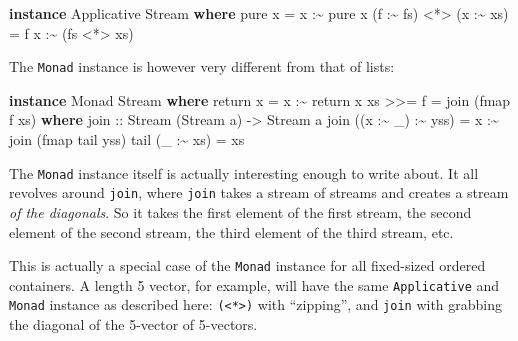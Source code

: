 \documentclass[]{article}
\newenvironment{Shaded}{}{}
\newcommand{\DataTypeTok}[1]{\textcolor[rgb]{0.56,0.13,0.00}{#1}}
\newcommand{\FunctionTok}[1]{\textcolor[rgb]{0.02,0.16,0.49}{#1}}
\newcommand{\KeywordTok}[1]{\textcolor[rgb]{0.00,0.44,0.13}{\textbf{#1}}}
\newcommand{\NormalTok}[1]{#1}
\newcommand{\OperatorTok}[1]{\textcolor[rgb]{0.40,0.40,0.40}{#1}}
\newcommand{\OtherTok}[1]{\textcolor[rgb]{0.00,0.44,0.13}{#1}}
\begin{document}
\begin{Shaded}
\begin{Highlighting}[]
\KeywordTok{instance} \DataTypeTok{Applicative} \DataTypeTok{Stream} \KeywordTok{where}
    \FunctionTok{pure}\NormalTok{ x }\OtherTok{=}\NormalTok{ x }\OperatorTok{:\textasciitilde{}} \FunctionTok{pure}\NormalTok{ x}
\NormalTok{    (f }\OperatorTok{:\textasciitilde{}}\NormalTok{ fs) }\OperatorTok{\textless{}*\textgreater{}}\NormalTok{ (x }\OperatorTok{:\textasciitilde{}}\NormalTok{ xs) }\OtherTok{=}\NormalTok{ f x }\OperatorTok{:\textasciitilde{}}\NormalTok{ (fs }\OperatorTok{\textless{}*\textgreater{}}\NormalTok{ xs)}
\end{Highlighting}
\end{Shaded}

The \texttt{Monad} instance is however very different from that of lists:

\begin{Shaded}
\begin{Highlighting}[]
\KeywordTok{instance} \DataTypeTok{Monad} \DataTypeTok{Stream} \KeywordTok{where}
    \FunctionTok{return}\NormalTok{ x }\OtherTok{=}\NormalTok{ x }\OperatorTok{:\textasciitilde{}} \FunctionTok{return}\NormalTok{ x}
\NormalTok{    xs }\OperatorTok{\textgreater{}\textgreater{}=}\NormalTok{ f }\OtherTok{=}\NormalTok{ join\textquotesingle{} (}\FunctionTok{fmap}\NormalTok{ f xs)}
      \KeywordTok{where}
\OtherTok{        join\textquotesingle{} ::} \DataTypeTok{Stream}\NormalTok{ (}\DataTypeTok{Stream}\NormalTok{ a) }\OtherTok{{-}\textgreater{}} \DataTypeTok{Stream}\NormalTok{ a}
\NormalTok{        join\textquotesingle{} ((x }\OperatorTok{:\textasciitilde{}}\NormalTok{ \_) }\OperatorTok{:\textasciitilde{}}\NormalTok{ yss) }\OtherTok{=}\NormalTok{ x }\OperatorTok{:\textasciitilde{}}\NormalTok{ join\textquotesingle{} (}\FunctionTok{fmap}\NormalTok{ tail\textquotesingle{} yss)}
\NormalTok{        tail\textquotesingle{} (\_ }\OperatorTok{:\textasciitilde{}}\NormalTok{ xs) }\OtherTok{=}\NormalTok{ xs}
\end{Highlighting}
\end{Shaded}

The \texttt{Monad} instance itself is actually interesting enough to write
about. It all revolves around \texttt{join}, where \texttt{join} takes a stream
of streams and creates a stream \emph{of the diagonals}. So it takes the first
element of the first stream, the second element of the second stream, the third
element of the third stream, etc.

This is actually a special case of the \texttt{Monad} instance for all
fixed-sized ordered containers. A length 5 vector, for example, will have the
same \texttt{Applicative} and \texttt{Monad} instance as described here:
\texttt{(\textless{}*\textgreater{})} with ``zipping'', and \texttt{join} with
grabbing the diagonal of the 5-vector of 5-vectors.
\end{document}
